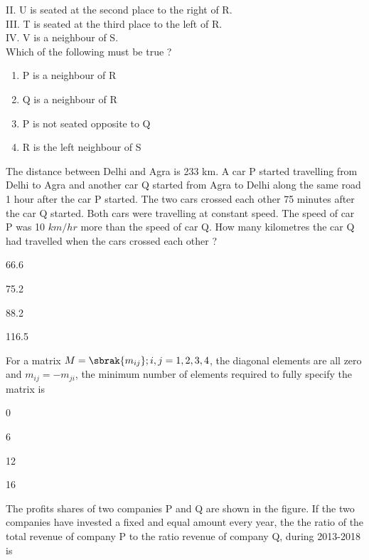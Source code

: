 		II. U is seated at the second place to the right of R. \\
		III. T is seated at the third place to the left of R. \\
		IV. V is a neighbour of S. \\
		Which of the following must be true ?
		\begin{enumerate}
			\item P is a neighbour of R
			\item Q is a neighbour of R
			\item P is not seated opposite to Q
			\item R is the left neighbour of S
		\end{enumerate}
	\item The distance between Delhi and Agra is 233 km. A car P started travelling from Delhi to Agra and another car Q started from Agra to Delhi along the same road 1 hour after the car P started. The two cars crossed each other 75 minutes after the car Q started. Both cars were travelling at constant speed. The speed of car P was 10 $km/hr$ more than the speed of car Q. How many kilometres the car Q had travelled when the cars crossed each other ?
		\begin{enumerate}
		\end{enumerate}
	\item For a matrix $M = \sbrak{m_{ij}} ; i,j = 1,2,3,4$, the diagonal elements are all zero and $m_{ij} = -m_{ji}$, the minimum number of elements required to fully specify the matrix is 
		\begin{enumerate}
				\begin{multicols}{4}
				\item 0
				\item 6
				\item 12
				\item 16
				\end{multicols}
		\end{enumerate}
	\item The profits shares of two companies P and Q are shown in the figure. If the two companies have invested a fixed and equal amount every year, the the ratio of the total revenue of company P to the ratio revenue of company Q, during 2013-2018 is
